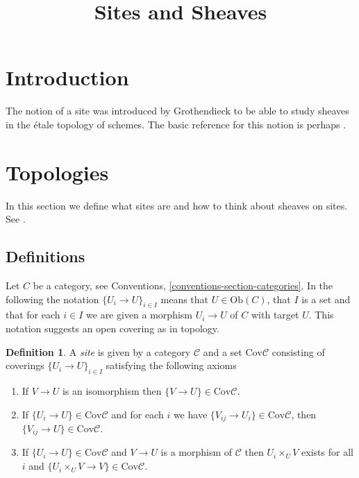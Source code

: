 \documentclass{amsart}
\theoremstyle{definition}
\newtheorem{definition}[theorem]{Definition}
\theoremstyle{remark}
\numberwithin{equation}{subsection}
\begin{document}
\title{Sites and Sheaves}


\maketitle
\thispagestyle{fancy}

\tableofcontents

\section{Introduction}
\label{section-introduction}

\noindent
The notion of a site was introduced by Grothendieck to be able to study
sheaves in the \'etale topology of schemes. The basic reference for this
notion is perhaps \cite{SGA4}. 

\section{Topologies}
\label{section-topologies}

\noindent
In this section we define what sites are and how to think about sheaves
on sites. See \cite{ArtinTopologies}.

\subsection{Definitions}
\label{subsection-sites-definitions}

\noindent
Let $C$ be a category, see Conventions, 
\autoref{conventions-section-categories}. 
In the following the notation $\{U_i \to U\}_{i\in I}$ means that 
$U \in \text{Ob}(C)$, that $I$ is a set and that for each $i\in I$ 
we are given a morphism $U_i \to U$ of $C$ with target $U$. This
notation suggests an open covering as in topology.

\begin{definition}
\label{definition-site}
A {\it site} is given by a category $\mathcal{C}$ and a set 
$\text{Cov} \mathcal{C}$ consisting of coverings 
$\{U_i \to U\}_{i \in I}$ satisfying the following axioms
\begin{enumerate}
\item If $V \to U$ is an isomorphism then $\{V \to U\} \in 
\text{Cov} \mathcal{C}$.
\item If $\{U_i \to U\} \in \text{Cov} \mathcal{C}$ and for each
$i$ we have $\{V_{ij} \to U_i\} \in \text{Cov} \mathcal{C}$, then
$\{V_{ij} \to U\} \in \text{Cov} \mathcal{C}$.
\item If $\{U_i \to U\}\in \text{Cov} \mathcal{C}$ and $V \to U$ is a
morphism of $\mathcal{C}$ then $U_i \times_U V$ exists for all
$i$ and $\{U_i \times_U V \to V \} \in \text{Cov} \mathcal{C}$.
\end{enumerate}
\end{definition}
\end{document}
